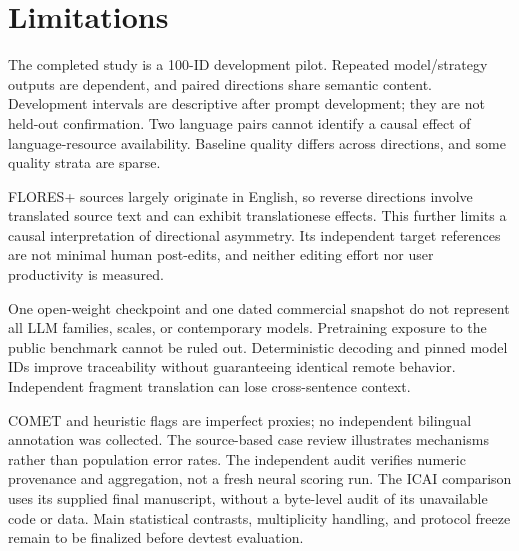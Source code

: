 \section{Limitations}
The completed study is a 100-ID development pilot. Repeated model/strategy outputs are dependent, and paired directions share semantic content. Development intervals are descriptive after prompt development; they are not held-out confirmation. Two language pairs cannot identify a causal effect of language-resource availability. Baseline quality differs across directions, and some quality strata are sparse.

FLORES+ sources largely originate in English, so reverse directions involve translated source text and can exhibit translationese effects. This further limits a causal interpretation of directional asymmetry. Its independent target references are not minimal human post-edits, and neither editing effort nor user productivity is measured.

One open-weight checkpoint and one dated commercial snapshot do not represent all LLM families, scales, or contemporary models. Pretraining exposure to the public benchmark cannot be ruled out. Deterministic decoding and pinned model IDs improve traceability without guaranteeing identical remote behavior. Independent fragment translation can lose cross-sentence context.

COMET and heuristic flags are imperfect proxies; no independent bilingual annotation was collected. The source-based case review illustrates mechanisms rather than population error rates. The independent audit verifies numeric provenance and aggregation, not a fresh neural scoring run. The ICAI comparison uses its supplied final manuscript, without a byte-level audit of its unavailable code or data. Main statistical contrasts, multiplicity handling, and protocol freeze remain to be finalized before devtest evaluation.
